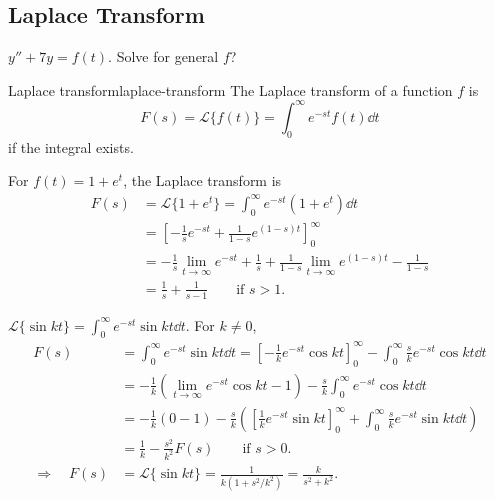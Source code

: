 \subsection{Laplace Transform}

\begin{example}
  $y''+7y=f(t)$. Solve for general $f$?
\end{example}

\begin{definition}{Laplace transform}{laplace-transform}
  The Laplace transform of a function $f$ is
  \[
    F(s)=\mathcal L\{f(t)\}=\int_0^\infty e^{-st}f(t)\dd t
  \]
  if the integral exists.
\end{definition}

\begin{example}
  For $f(t)=1+e^t$, the Laplace transform is
  \begin{align*}
    F(s) & =\mathcal L\{1+e^t\}=\int_0^\infty e^{-st}(1+e^t)\dd t        \\
         & =\left[-\frac1s e^{-st}+\frac1{1-s}e^{(1-s)t}\right]_0^\infty \\
         & =-\frac1s\lim_{t\to\infty}e^{-st}+\frac1s
    +\frac1{1-s}\lim_{t\to\infty}e^{(1-s)t}-\frac1{1-s}                  \\
         & =\frac1s+\frac1{s-1}\qquad\text{if }s>1.
  \end{align*}
\end{example}

\begin{example}
  $\mathcal L\{\sin kt\}=\int_0^\infty e^{-st}\sin kt\dd t$.
  For $k\ne0$,
  \begin{align*}
    F(s)                  & =\int_0^\infty e^{-st}\sin kt\dd t
    =\left[-\frac1k e^{-st}\cos kt\right]_0^\infty
    -\int_0^\infty\frac{s}{k}e^{-st}\cos kt\dd t                                    \\
                          & =-\frac1k\left(\lim_{t\to\infty}e^{-st}\cos kt-1\right)
    -\frac{s}{k}\int_0^\infty e^{-st}\cos kt\dd t                                   \\
                          & =-\frac1k(0-1)-\frac{s}{k}\left(
    \left[\frac1k e^{-st}\sin kt\right]_0^\infty
    +\int_0^\infty\frac{s}{k}e^{-st}\sin kt\dd t\right)                             \\
                          & =\frac1k-\frac{s^2}{k^2}F(s)\qquad\text{if }s>0.        \\
    \Rightarrow\quad F(s) & =\mathcal L\{\sin kt\}
    =\frac{1}{k(1+s^2/k^2)}=\frac{k}{s^2+k^2}.
  \end{align*}
\end{example}

